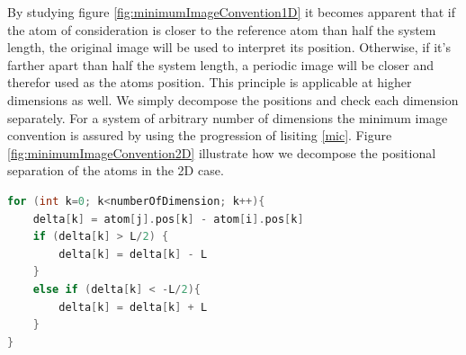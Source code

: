 \documentclass[twoside,english]{uiofysmaster}
\begin{document}
By studying figure \ref{fig:minimumImageConvention1D} it becomes apparent that if the atom of consideration is closer to the reference atom than half the system length, the original image will be used to interpret its position. 
Otherwise, if it's farther apart than half the system length, a periodic image will be closer and therefor used as the atoms position.  
This principle is applicable at higher dimensions as well. We simply decompose the positions and check each dimension separately. For a system of arbitrary number of dimensions the minimum image convention is assured by using the progression of lisiting \ref{mic}. 
Figure \ref{fig:minimumImageConvention2D} illustrate how we decompose the positional separation of the atoms in the 2D case.

\begin{lstlisting}[caption={Loop to compute the position of the closest periodic image of atom $j$ with respect to the reference atom $i$.}, label={mic}, language=c++]
for (int k=0; k<numberOfDimension; k++){
	delta[k] = atom[j].pos[k] - atom[i].pos[k]
	if (delta[k] > L/2) {
		delta[k] = delta[k] - L
	}
	else if (delta[k] < -L/2){
		delta[k] = delta[k] + L
	}
}
\end{lstlisting}

\begin{figure}[H]
\end{figure}

\begin{figure}[H]
\end{figure}
\end{document}
